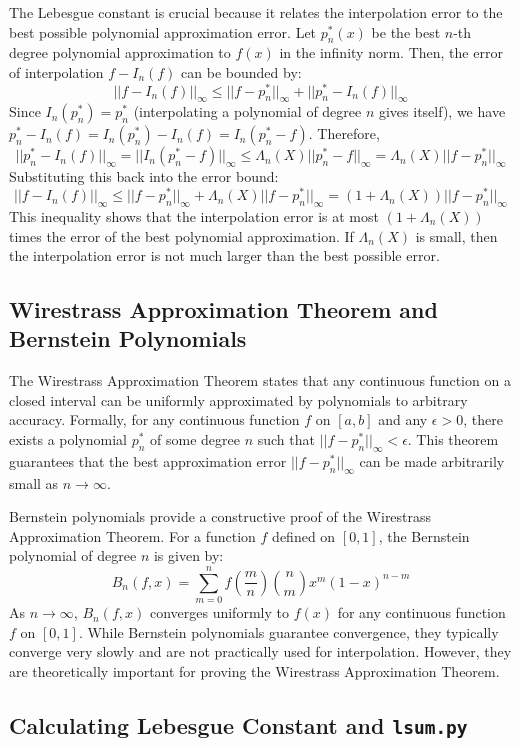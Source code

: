 \documentclass{article}
\begin{document}
The Lebesgue constant is crucial because it relates the interpolation error to the best possible polynomial approximation error. Let $p_n^*(x)$ be the best $n$-th degree polynomial approximation to $f(x)$ in the infinity norm. Then, the error of interpolation $f - I_n(f)$ can be bounded by:
\[
||f - I_n(f)||_{\infty} \leq ||f - p_n^*||_{\infty} + ||p_n^* - I_n(f)||_{\infty}
\]
Since $I_n(p_n^*) = p_n^*$ (interpolating a polynomial of degree $n$ gives itself), we have $p_n^* - I_n(f) = I_n(p_n^*) - I_n(f) = I_n(p_n^* - f)$. Therefore,
\[
||p_n^* - I_n(f)||_{\infty} = ||I_n(p_n^* - f)||_{\infty} \leq \Lambda_n(X) ||p_n^* - f||_{\infty} = \Lambda_n(X) ||f - p_n^*||_{\infty}
\]
Substituting this back into the error bound:
\[
||f - I_n(f)||_{\infty} \leq ||f - p_n^*||_{\infty} + \Lambda_n(X) ||f - p_n^*||_{\infty} = (1 + \Lambda_n(X)) ||f - p_n^*||_{\infty}
\]
This inequality shows that the interpolation error is at most $(1 + \Lambda_n(X))$ times the error of the best polynomial approximation. If $\Lambda_n(X)$ is small, then the interpolation error is not much larger than the best possible error.

\subsection{Wirestrass Approximation Theorem and Bernstein Polynomials}
The Wirestrass Approximation Theorem states that any continuous function on a closed interval can be uniformly approximated by polynomials to arbitrary accuracy.  Formally, for any continuous function $f$ on $[a, b]$ and any $\epsilon > 0$, there exists a polynomial $p_n^*$ of some degree $n$ such that $||f - p_n^*||_{\infty} < \epsilon$. This theorem guarantees that the best approximation error $||f - p_n^*||_{\infty}$ can be made arbitrarily small as $n \to \infty$.

Bernstein polynomials provide a constructive proof of the Wirestrass Approximation Theorem. For a function $f$ defined on $[0, 1]$, the Bernstein polynomial of degree $n$ is given by:
\[
B_n(f, x) = \sum_{m=0}^{n} f\left(\frac{m}{n}\right) \binom{n}{m} x^m (1 - x)^{n-m}
\]
As $n \to \infty$, $B_n(f, x)$ converges uniformly to $f(x)$ for any continuous function $f$ on $[0, 1]$.  While Bernstein polynomials guarantee convergence, they typically converge very slowly and are not practically used for interpolation. However, they are theoretically important for proving the Wirestrass Approximation Theorem.

\subsection{Calculating Lebesgue Constant and \texttt{lsum.py}}
\end{document}
